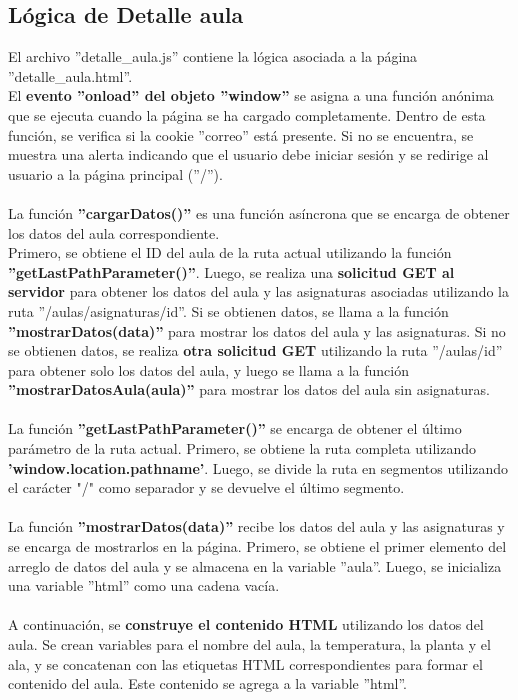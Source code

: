 \documentclass[12pt]{report}
\begin{document}
\subsection{Lógica de Detalle aula}
El archivo ''detalle\_aula.js'' contiene la lógica asociada a la página ''detalle\_aula.html''.
\\
El \textbf{evento ''onload'' del objeto ''window''} se asigna a una función anónima que se ejecuta cuando la página se ha cargado completamente. Dentro de esta función, se verifica si la cookie ''correo'' está presente. Si no se encuentra, se muestra una alerta indicando que el usuario debe iniciar sesión y se redirige al usuario a la página principal (''/'').
\\\\
La función \textbf{''cargarDatos()''} es una función asíncrona que se encarga de obtener los datos del aula correspondiente. \\Primero, se obtiene el ID del aula de la ruta actual utilizando la función \textbf{''getLastPathParameter()''}. Luego, se realiza una \textbf{solicitud GET al servidor} para obtener los datos del aula y las asignaturas asociadas utilizando la ruta ''/aulas/asignaturas/{id}''. Si se obtienen datos, se llama a la función \textbf{''mostrarDatos(data)''} para mostrar los datos del aula y las asignaturas. Si no se obtienen datos, se realiza\textbf{ otra solicitud GET} utilizando la ruta ''/aulas/{id}'' para obtener solo los datos del aula, y luego se llama a la función \textbf{''mostrarDatosAula(aula)''} para mostrar los datos del aula sin asignaturas.
\\\\
La función \textbf{''getLastPathParameter()''} se encarga de obtener el último parámetro de la ruta actual. Primero, se obtiene la ruta completa utilizando \textbf{'window.location.pathname'}. Luego, se divide la ruta en segmentos utilizando el carácter "/" como separador y se devuelve el último segmento.
\\\\
La función \textbf{''mostrarDatos(data)''} recibe los datos del aula y las asignaturas y se encarga de mostrarlos en la página. Primero, se obtiene el primer elemento del arreglo de datos del aula y se almacena en la variable ''aula''. Luego, se inicializa una variable ''html'' como una cadena vacía.
\\\\
A continuación, se \textbf{construye el contenido HTML} utilizando los datos del aula. Se crean variables para el nombre del aula, la temperatura, la planta y el ala, y se concatenan con las etiquetas HTML correspondientes para formar el contenido del aula. Este contenido se agrega a la variable ''html''.
\end{document}
